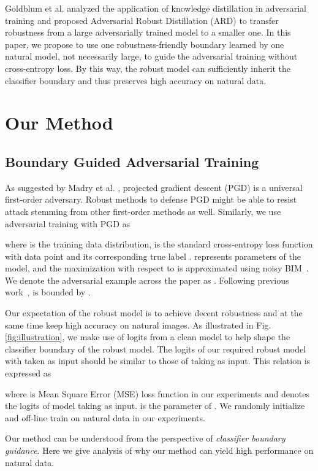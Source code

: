 \documentclass[final]{cvpr}
\begin{document}
Goldblum et al. \cite{goldblum2019adversarially} analyzed the application of knowledge distillation in adversarial training and proposed Adversarial Robust Distillation (ARD) to transfer robustness from a large adversarially trained model to a smaller one. In this paper, we propose to use one robustness-friendly boundary learned by one natural model, not necessarily large, to guide the adversarial training without cross-entropy loss. By this way, the robust model can sufficiently inherit the classifier boundary and thus preserves high accuracy on natural data.

\section{Our Method}
\subsection{Boundary Guided Adversarial Training}
As suggested by Madry et al. \cite{DBLP:conf/iclr/MadryMSTV18}, projected gradient descent (PGD) is a universal first-order adversary. Robust methods to defense PGD might be able to resist attack stemming from other first-order methods as well. Similarly, we use adversarial training with
PGD as

where  is the training data distribution,
 is the standard cross-entropy loss function with data point  and its corresponding true label .  represents parameters of the model, and the maximization with respect to  is approximated using noisy BIM~\cite{DBLP:conf/iclr/KurakinGB17a}. We denote the adversarial example  across the paper as . Following previous work~\cite{zhang2019theoretically,DBLP:conf/iclr/MadryMSTV18},  is bounded by .

Our expectation of the robust model is to achieve decent robustness and at the same time keep high accuracy on natural images. 
As illustrated in Fig. \ref{fig:illustration}, we make use of logits from a clean model to help shape the classifier boundary of the robust model. The logits of our required robust model  with  taken as input should be similar to those of  taking  as input. This relation is expressed as

where  is Mean Square Error (MSE) loss function in our experiments and  denotes the logits of model  taking  as input.  is the parameter of . We randomly initialize  and off-line train  on natural data in our experiments.

Our method can be understood from the perspective of \textit{classifier boundary guidance}. Here we give analysis of why our method can yield high performance on natural data.
\end{document}
